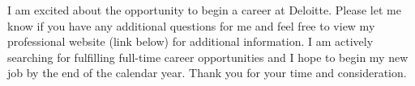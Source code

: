 \documentclass[11pt,a4paper,sans]{moderncv}
\begin{document}
	
	
	\vspace{.5cm} 
	
	I am excited about the opportunity to begin a career at Deloitte. Please let me know if you have any additional questions for me and feel free to view my professional website (link below) for additional information. I am actively searching for fulfilling full-time career opportunities and I hope to begin my new job by the end of the calendar year. Thank you for your time and consideration.\\
	
	\vspace{1cm}
	
	\makeletterclosing
	
\end{document}
